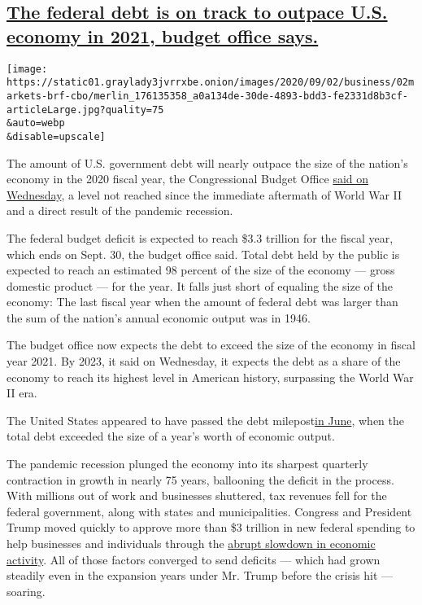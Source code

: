 \hypertarget{the-federal-debt-is-on-track-to-outpace-us-economy-in-2021-budget-office-says}{%
\subsection{\texorpdfstring{\protect\hyperlink{the-federal-debt-is-on-track-to-outpace-us-economy-in-2021-budget-office-says}{The
federal debt is on track to outpace U.S. economy in 2021, budget office
says.}}{The federal debt is on track to outpace U.S. economy in 2021, budget office says.}}\label{the-federal-debt-is-on-track-to-outpace-us-economy-in-2021-budget-office-says}}

\texttt{[image: https://static01.graylady3jvrrxbe.onion/images/2020/09/02/business/02markets-brf-cbo/merlin\_176135358\_a0a134de-30de-4893-bdd3-fe2331d8b3cf-articleLarge.jpg?quality=75\\\&auto=webp\\\&disable=upscale]}

The amount of U.S. government debt will nearly outpace the size of the
nation's economy in the 2020 fiscal year, the Congressional Budget
Office
\href{https://www.cbo.gov/system/files/2020-09/56517-Budget-Outlook.pdf}{said
on Wednesday}, a level not reached since the immediate aftermath of
World War II and a direct result of the pandemic recession.

The federal budget deficit is expected to reach \$3.3 trillion for the
fiscal year, which ends on Sept. 30, the budget office said. Total debt
held by the public is expected to reach an estimated 98 percent of the
size of the economy --- gross domestic product --- for the year. It
falls just short of equaling the size of the economy: The last fiscal
year when the amount of federal debt was larger than the sum of the
nation's annual economic output was in 1946.

The budget office now expects the debt to exceed the size of the economy
in fiscal year 2021. By 2023, it said on Wednesday, it expects the debt
as a share of the economy to reach its highest level in American
history, surpassing the World War II era.

The United States appeared to have passed the debt
milepost\href{https://www.nytimes3xbfgragh.onion/2020/08/21/business/economy/national-debt-coronavirus-stimulus.html}{in
June}, when the total debt exceeded the size of a year's worth of
economic output.

The pandemic recession plunged the economy into its sharpest quarterly
contraction in growth in nearly 75 years, ballooning the deficit in the
process. With millions out of work and businesses shuttered, tax
revenues fell for the federal government, along with states and
municipalities. Congress and President Trump moved quickly to approve
more than \$3 trillion in new federal spending to help businesses and
individuals through the
\href{https://www.nytimes3xbfgragh.onion/2020/03/22/us/politics/coronavirus-economy-shutdown.html}{abrupt
slowdown in economic activity}. All of those factors converged to send
deficits --- which had grown steadily even in the expansion years under
Mr. Trump before the crisis hit --- soaring.


